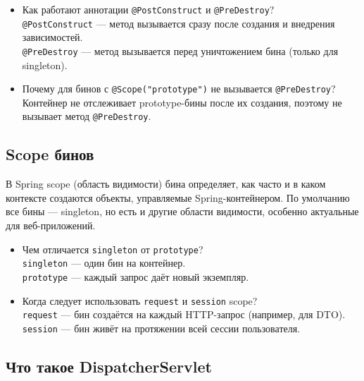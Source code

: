 \documentclass[a4paper,14pt]{article}
\begin{document}
\begin{itemize}
\item Как работают аннотации \texttt{@PostConstruct} и \texttt{@PreDestroy}? \\
\texttt{@PostConstruct} — метод вызывается сразу после создания и внедрения зависимостей. \\
\texttt{@PreDestroy} — метод вызывается перед уничтожением бина (только для singleton).

\item Почему для бинов с \texttt{@Scope("prototype")} не вызывается \texttt{@PreDestroy}? \\
Контейнер не отслеживает prototype-бины после их создания, поэтому не вызывает метод \texttt{@PreDestroy}.
\end{itemize}

\subsection{Scope бинов}
В Spring scope (область видимости) бина определяет, как часто и в каком контексте создаются объекты, управляемые Spring-контейнером. По умолчанию все бины — singleton, но есть и другие области видимости, особенно актуальные для веб-приложений.
\begin{itemize}
\item Чем отличается \texttt{singleton} от \texttt{prototype}? \\
\texttt{singleton} — один бин на контейнер. \\
\texttt{prototype} — каждый запрос даёт новый экземпляр.

\item Когда следует использовать \texttt{request} и \texttt{session} scope? \\
\texttt{request} — бин создаётся на каждый HTTP-запрос (например, для DTO). \\
\texttt{session} — бин живёт на протяжении всей сессии пользователя.
\end{itemize}
\subsection{Что такое DispatcherServlet}
\end{document}
